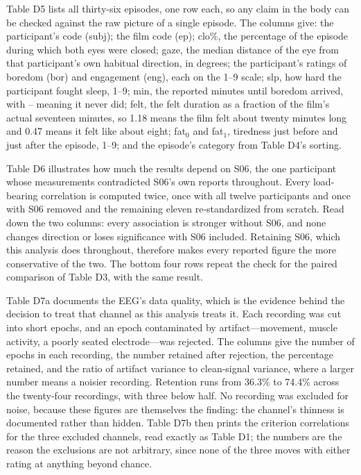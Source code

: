 Table D5 lists all thirty-six episodes, one row each, so any claim in the body can be
checked against the raw picture of a single episode. The columns give: the participant's
code (subj); the film code (ep); clo\%, the percentage of the episode during which both eyes
were closed; gaze, the median distance of the eye from that participant's own habitual
direction, in degrees; the participant's ratings of boredom (bor) and engagement (eng), each
on the 1--9 scale; slp, how hard the participant fought sleep, 1--9; min, the reported
minutes until boredom arrived, with -- meaning it never did; felt, the felt duration as a
fraction of the film's actual seventeen minutes, so 1.18 means the film felt about twenty
minutes long and 0.47 means it felt like about eight; fat$_0$ and fat$_1$, tiredness just
before and just after the episode, 1--9; and the episode's category from Table D4's sorting.

% 

Table D6 illustrates how much the results depend on S06, the one participant whose
measurements contradicted S06's own reports throughout. Every
load-bearing correlation is computed twice, once with all twelve participants and once with
S06 removed and the remaining eleven re-standardized from scratch. Read down the two
columns: every association is stronger without S06, and none changes direction or loses
significance with S06 included. Retaining S06, which this analysis does throughout,
therefore makes every reported figure the more conservative of the two. The bottom four
rows repeat the check for the paired comparison of Table D3, with the same result.

% 

Table D7a documents the EEG's data quality, which is the evidence behind the decision to
treat that channel as this analysis treats it. Each recording was cut into short epochs, and
an epoch contaminated by artifact---movement, muscle activity, a poorly seated
electrode---was rejected. The columns give the number of epochs in each recording, the
number retained after rejection, the percentage retained, and the ratio of artifact variance
to clean-signal variance, where a larger number means a noisier recording. Retention runs
from 36.3\% to 74.4\% across the twenty-four recordings, with three below half. No recording
was excluded for noise, because these figures are themselves the finding: the channel's
thinness is documented rather than hidden. Table D7b then prints the criterion correlations
for the three excluded channels, read exactly as Table D1; the numbers are the reason the
exclusions are not arbitrary, since none of the three moves with either rating at anything
beyond chance.

